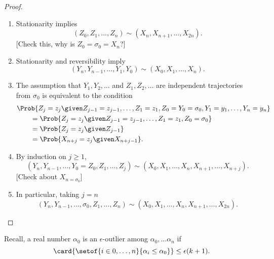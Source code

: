 \documentclass[12pt]{article}
\begin{document}
\begin{proof}
    \begin{enumerate}
        \item
            Stationarity implies
            \[
                (Z_0, Z_1, \dots, Z_n) \sim (X_n, X_{n+1}, \dots, X_{2n}).
              \]
              [Check this, why is $Z_0 = \sigma_0 = X_n$?]
        \item
            Stationarity and reversibility imply
            \[
                (Y_n, Y_{n-1}, \dots, Y_1, Y_0) \sim (X_0, X_1, \dots, X_n).
            \]
        \item
            The assumption that \( Y_1, Y_2, \dots \) and \( Z_1, Z_2,
            \dots \) are independent trajectories from \( \sigma_0 \) is
            equivalent to the condition
            \begin{align*}
                & \Prob{ Z_j = z_j \given Z_{j-1} = z_{j-1}, \dots, Z_1 = z_1, Z_0
                = Y_0=\sigma_0, Y_1=y_1, \dots, Y_n = y_n} \\
                & \qquad = \Prob{ Z_j = z_j \given Z_{j-1} = z_{j-1}, \dots, Z_1 =
                z_1, Z_0 = \sigma_0} \\
                & \qquad = \Prob{ Z_j = z_j \given Z_{j-1}} \\
                &\qquad = \Prob{ X_{n+j} = z_j \given X_{n+j-1}}.
            \end{align*}
        \item
            By induction on \( j \ge 1 \),
            \[
                (Y_n, Y_{n-1}, \dots, Y_0=Z_0, Z_1, \dots, Z_j) \sim (X_0,
                X_1, \dots, X_n, X_{n+1}, \dots, X_{n+j}).
              \]
              [Check about $X_{n = \sigma_0}$]
        \item
            In particular, taking \( j = n \)
            \[
                (Y_n, Y_{n-1}, \dots, \sigma_0, Z_1, \dots, Z_n) \sim (X_0,
                X_1, \dots, X_n, X_{n+1}, \dots, X_{2n}).
            \]
    \end{enumerate}
\end{proof}

Recall, a real number \( \alpha_0 \) is an \( \epsilon \)-outlier among \(
\alpha_0, \dots \alpha_n \) if
\[
    \card{\setof{i \in 0, \dots, n}{ \alpha_i \le \alpha_0 }} \le
    \epsilon(k+1).
\]
\end{document}
